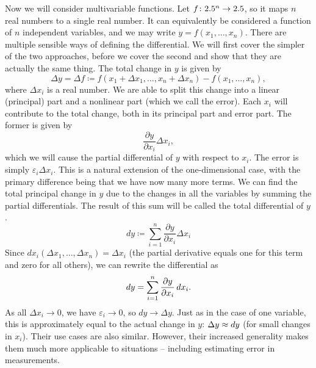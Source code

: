 \documentclass[a4paper,12pt]{article}
\begin{document}
Now we will consider multivariable functions.
Let $f\colon 2.5^n \to 2.5$, so it maps $n$ real numbers to a single real number.
It can equivalently be considered a function of $n$ independent variables, and we may write $y = f(x_1, \ldots, x_n)$.
There are multiple sensible ways of defining the differential.
We will first cover the simpler of the two approaches, before we cover the second and show that they are actually the same thing.
The total change in $y$ is given by
\begin{equation*}
    \Delta y = \Delta f \coloneq f(x_1 + \Delta x_1, \ldots, x_n + \Delta x_n) - f(x_1, \ldots, x_n),
\end{equation*}
where $\Delta x_i$ is a real number.
We are able to split this change into a linear (principal) part and a nonlinear part (which we call the error).
Each $x_i$ will contribute to the total change, both in its principal part and error part.
The former is given by
\begin{equation*}
    \frac{\partial y}{\partial x_i} \Delta x_i,
\end{equation*}
which we will cause the partial differential of $y$ with respect to $x_i$.
The error is simply $\varepsilon_i \Delta x_i$.
This is a natural extension of the one-dimensional case, with the primary difference being that we have now many more terms.
We can find the total principal change in $y$ due to the changes in all the variables by summing the partial differentials.
The result of this sum will be called the total differential of $y$.
\begin{equation*}
    dy \coloneq \sum_{i=1}^{n} \frac{\partial y}{\partial x_i} \Delta x_i
\end{equation*}
Since $dx_i(\Delta x_1, \ldots, \Delta x_n) = \Delta x_i$ (the partial derivative equals one for this term and zero for all others), we can rewrite the differential as
\begin{equation*}
    dy = \sum_{i=1}^{n} \frac{\partial y}{\partial x_i} \mathop{}\!d x_i.
\end{equation*}
As all $\Delta x_i \to 0$, we have $\varepsilon_i \to 0$, so $dy \to \Delta y$.
Just as in the case of one variable, this is approximately equal to the actual change in $y$: $\Delta y \approx \mathop{}\!d y$ (for small changes in $x_i$).
Their use cases are also similar.
However, their increased generality makes them much more applicable to situations -- including estimating error in measurements.
\end{document}
